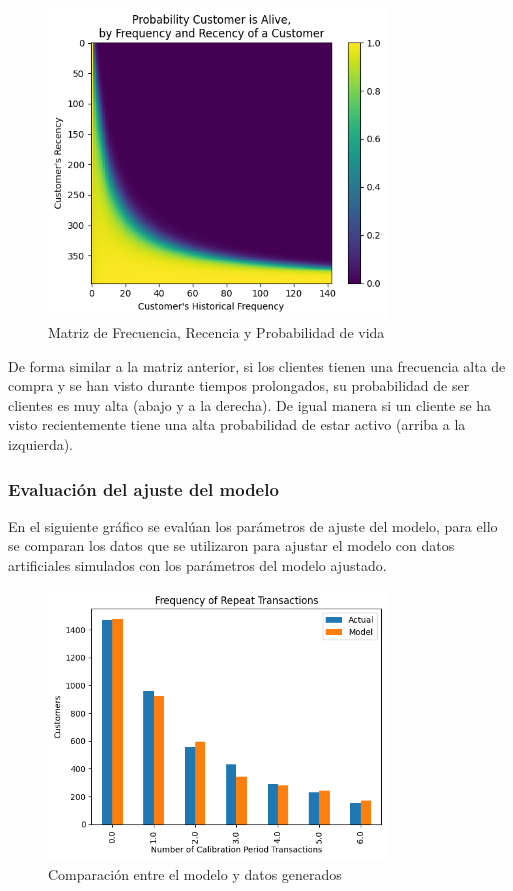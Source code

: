 \begin{figure}[H]
	\centering \includegraphics[width=0.80\textwidth]{images/probabilidad-vida.png}
	\caption{Matriz de Frecuencia, Recencia y Probabilidad de vida}
	\label{fig:frp}
\end{figure}

De forma similar a la matriz anterior, si los clientes tienen una frecuencia alta de compra y se han visto durante tiempos prolongados, su probabilidad de ser clientes es muy alta (abajo y a la derecha). De igual manera si un cliente se ha visto recientemente tiene una alta probabilidad de estar activo (arriba a la izquierda).

\subsubsection{Evaluación del ajuste del modelo}

En el siguiente gráfico se evalúan los parámetros de ajuste del modelo, para ello se comparan los datos que se utilizaron para ajustar el modelo con datos artificiales simulados con los parámetros del modelo ajustado.

\begin{figure}[H]
	\centering \includegraphics[width=0.80\textwidth]{images/ajuste-modelo.png}
	\caption{Comparación entre el modelo y datos generados}
	\label{fig:ajuste}
\end{figure}

